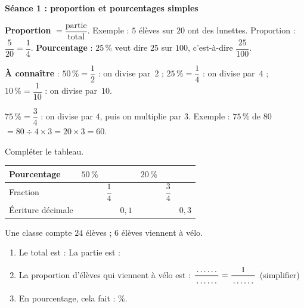 \documentclass[a4paper,11pt,fleqn]{article}
\renewcommand{\arraystretch}{1.5}
\newcommand{\pt}[1][1.6cm]{\makebox[#1]{\dotfill}}
\newcommand{\seance}[1]{{\large\bfseries\textcolor{couleur_theme}{#1}}\par\smallskip}
\begin{document}


\seance{Séance 1 : proportion et pourcentages simples}

\begin{tcolorbox}[colback=white, colframe=couleur_theme, title=\textbf{Rappel}, fonttitle=\bfseries]
\textbf{Proportion} \quad $= \dfrac{\text{partie}}{\text{total}}$. \qquad Exemple : $5$ élèves sur $20$ ont des lunettes. \quad Proportion : $\dfrac{5}{20} = \dfrac{1}{4}$.
\textbf{Pourcentage} : $25\,\%$ veut dire $25$ sur $100$, c'est-à-dire $\dfrac{25}{100}$.

\smallskip
\textbf{À connaître} : $50\,\% = \dfrac{1}{2}$ : on divise par~$2$ ; \enspace $25\,\% = \dfrac{1}{4}$ : on divise par~$4$ ; \enspace $10\,\% = \dfrac{1}{10}$ : on divise par~$10$.

\smallskip
$75\,\% = \dfrac{3}{4}$ : on divise par $4$, puis on multiplie par $3$. \qquad Exemple : $75\,\%$ de $80$ \quad $= 80 \div 4 \times 3 = 20 \times 3 = 60$.
\end{tcolorbox}

\begin{EXO}{}{}
Compléter le tableau.
\vspace{-0.6em}
\begin{center}
\renewcommand{\arraystretch}{1}
\begin{tabular}{|>{\rule[-2ex]{0pt}{5.6ex}}l|*{6}{w{c}{1.9cm}|}}
	\hline
	Pourcentage & $50\,\%$ & & & $20\,\%$ & & \\ \hline
	Fraction & & $\dfrac{1}{4}$ & & & $\dfrac{3}{4}$ & \\ \hline
	Écriture décimale & & & $0{,}1$ & & & $0{,}3$ \\ \hline
\end{tabular}
\end{center}
\end{EXO}

\begin{EXO}{}{}
Une classe compte $24$ élèves ; $6$ élèves viennent à vélo.
\begin{enumerate}[itemsep=0pt]
	\item Le total est : \pt[1.5cm] \qquad La partie est : \pt[1.5cm]
	\item La proportion d'élèves qui viennent à vélo est : \quad $\dfrac{\pt[1cm]}{\pt[1cm]} = \dfrac{1}{\pt[1cm]}$ \quad (simplifier)
	\item En pourcentage, cela fait : \pt[1.5cm] $\%$.
\end{enumerate}
\end{EXO}
\end{document}
